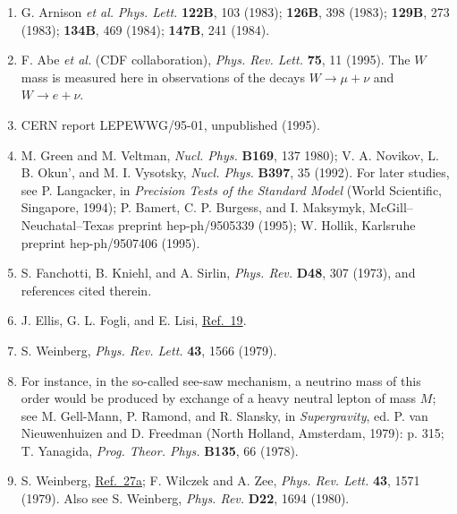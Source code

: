 \begin{enumerate}
\item {}\label{ch21-ref-22}
G. Arnison \emph{et al.} \emph{Phys. Lett.} \textbf{122B}, 103 (1983);
\textbf{126B}, 398 (1983); \textbf{129B}, 273 (1983); \textbf{134B}, 469
(1984); \textbf{147B}, 241 (1984).

\item {}\label{ch21-ref-23}
F. Abe \emph{et al.} (CDF collaboration), \emph{Phys. Rev. Lett.}
\textbf{75}, 11 (1995). The $W$ mass is measured here in observations of
the decays $W\to\mu+\nu$ and $W\to e+\nu$.

\item {}\label{ch21-ref-24}
CERN report LEPEWWG/95-01, unpublished (1995).

\item {}\label{ch21-ref-25}
M. Green and M. Veltman, \emph{Nucl. Phys.} \textbf{B169}, 137 1980);
V. A. Novikov, L. B. Okun', and M. I. Vysotsky, \emph{Nucl. Phys.}
\textbf{B397}, 35 (1992). For later studies, see P. Langacker, in
\emph{Precision Tests of the Standard Model} (World Scientific, Singapore,
1994); P. Bamert, C. P. Burgess, and I. Maksymyk,
McGill--Neuchatal--Texas preprint hep-ph/9505339 (1995); W. Hollik,
Karlsruhe preprint hep-ph/9507406 (1995).

\item {}\label{ch21-ref-26}
S. Fanchotti, B. Kniehl, and A. Sirlin, \emph{Phys. Rev.} \textbf{D48},
307 (1973), and references cited therein.

\item {}\label{ch21-ref-27}
J. Ellis, G. L. Fogli, and E. Lisi, \hyperref[ch21-ref-19]{Ref.~19}.

\item[27a.] \label{ch21-ref-27a}
S. Weinberg, \emph{Phys. Rev. Lett.} \textbf{43}, 1566 (1979).

\item[27b.] \label{ch21-ref-27b}
For instance, in the so-called see-saw mechanism, a neutrino mass of this
order would be produced by exchange of a heavy neutral lepton of mass $M$;
see M. Gell-Mann, P. Ramond, and R. Slansky, in \emph{Supergravity},
ed. P. van Nieuwenhuizen and D. Freedman (North Holland, Amsterdam, 1979):
p. 315; T. Yanagida, \emph{Prog. Theor. Phys.} \textbf{B135}, 66 (1978).

\item[27c.] \label{ch21-ref-27c}
S. Weinberg, \hyperref[ch21-ref-27a]{Ref.~27a}; F. Wilczek and A. Zee,
\emph{Phys. Rev. Lett.} \textbf{43}, 1571 (1979). Also see S. Weinberg,
\emph{Phys. Rev.} \textbf{D22}, 1694 (1980).


\end{enumerate}
